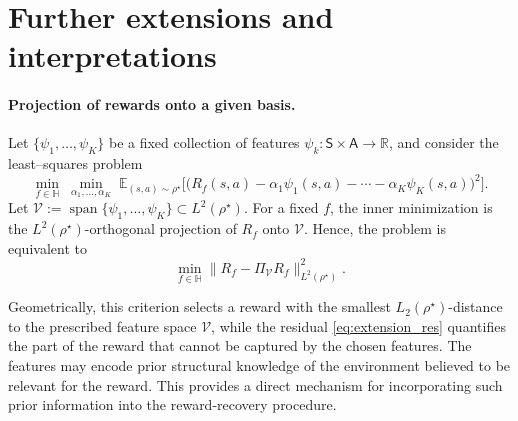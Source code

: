 \documentclass{article}
\theoremstyle{definition}
\theoremstyle{remark}
\theoremstyle{plain}
\newcommand{\E}{\mathbb{E}}
\numberwithin{equation}{section}
\begin{document}
\section{Further extensions and interpretations}
\label{sec:extensions}

\paragraph{Projection of rewards onto a given basis.}
Let $\{\psi_1,\ldots,\psi_K\}$ be a fixed collection of features
\(\psi_k:\mathsf S\times\mathsf A\to\mathbb R\), and consider the least--squares problem
\[
    \min_{f\in\mathbb{H}}\;\min_{\alpha_1,\ldots,\alpha_K}\;
    \E_{(s,a)\sim\rho^\star}\!\Big[
        \big(
            R_f(s,a) - \alpha_1 \psi_1(s,a) - \cdots - \alpha_K \psi_K(s,a)
        \big)^2
    \Big].
\]
Let
\(
    \mathcal V:=\operatorname{span}\{\psi_1,\ldots,\psi_K\}
    \subset L^2(\rho^\star).
\)
For a fixed \(f\), the inner minimization is the \(L^2(\rho^\star)\)-orthogonal
projection of \(R_f\) onto \(\mathcal V\). Hence, the problem is equivalent to
\begin{equation}
\label{eq:extension_res}
    \min_{f\in\mathbb H}
    \big\|
        R_f-\Pi_{\mathcal V}R_f
    \big\|_{L^2(\rho^\star)}^2.
\end{equation} 

Geometrically, this criterion selects a reward with the smallest
\(L_2(\rho^\star)\)-distance to the prescribed feature space
\(\mathcal V\), while
the residual \eqref{eq:extension_res} quantifies the part
of the reward that cannot be captured by the chosen features. 
The features may encode prior structural knowledge of the environment believed to be relevant for the reward. This
provides a direct mechanism for incorporating such prior information into the
reward-recovery procedure.
\end{document}
